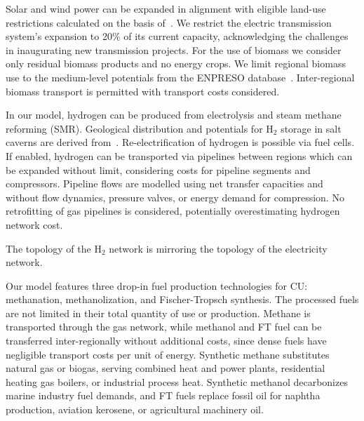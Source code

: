 \documentclass[twocolumn]{article}
\newcommand{\hydrogen}{H$_2$}
\begin{document}
Solar and wind power can be expanded in alignment with eligible land-use restrictions calculated on the basis of~\cite{eeaCorineLandCover2012,eeaNatura2000Data2016}. We restrict the electric transmission system's expansion to 20\% of its current capacity, acknowledging the challenges in inaugurating new transmission projects.
For the use of biomass we consider only residual biomass products and no energy crops. We limit regional biomass use to the medium-level potentials from the ENPRESO database~\cite{enspreso_database,instituteforenergyandtransportjointresearchcentreJRCEUTIMESModelBioenergy2015}. Inter-regional biomass transport is permitted with transport costs considered.

In our model, hydrogen can be produced from electrolysis and steam methane reforming (SMR). Geological distribution and potentials for \hydrogen{} storage in salt caverns are derived from~\cite{caglayanTechnicalPotentialSalt2020}. Re-electrification of hydrogen is possible via fuel cells. If enabled, hydrogen can be transported via pipelines between regions which can be expanded without limit, considering costs for pipeline segments and compressors. Pipeline flows are modelled using net transfer capacities and without flow dynamics, pressure valves, or energy demand for compression. No retrofitting of gas pipelines is considered, potentially overestimating hydrogen network cost.

The topology of the \hydrogen{} network is mirroring the topology of the electricity network.

Our model features three drop-in fuel production technologies for CU: methanation, methanolization, and Fischer-Tropsch synthesis. The processed fuels are not limited in their total quantity of use or production. Methane is transported through the gas network, while methanol and FT fuel can be transferred inter-regionally without additional costs, since dense fuels have negligible transport costs per unit of energy. Synthetic methane substitutes natural gas or biogas, serving combined heat and power plants, residential heating gas boilers, or industrial process heat. Synthetic methanol decarbonizes marine industry fuel demands, and FT fuels replace fossil oil for naphtha production, aviation kerosene, or agricultural machinery oil.
\end{document}
